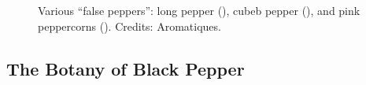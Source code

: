 \begin{figure}[!ht]
	\vspace{-4ex}
	\centering
	\hfill
	\hfill
	\caption[False peppers: long, cubeb, and pink.]{Various ``false peppers'': long pepper (), cubeb pepper (), and pink peppercorns (). Credits: Aromatiques.}
	\label{fig:false_peppers_imgs}
\end{figure}




\subsection{The Botany of Black Pepper} 

